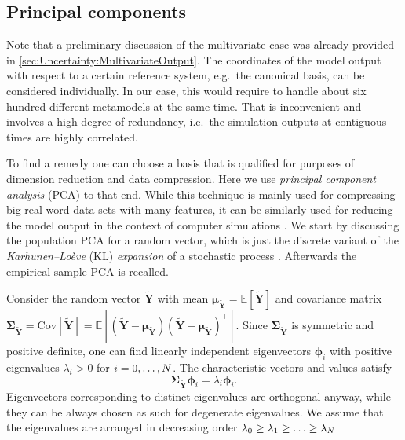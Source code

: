 \subsection{Principal components}
Note that a preliminary discussion of the multivariate case was already provided in \cref{sec:Uncertainty:MultivariateOutput}.
The coordinates of the model output with respect to a certain reference system, e.g.\ the canonical basis, can be considered individually.
In our case, this would require to handle about six hundred different metamodels at the same time.
That is inconvenient and involves a high degree of redundancy, i.e.\ the simulation outputs at contiguous times are highly correlated.
\par %
To find a remedy one can choose a basis that is qualified for purposes of dimension reduction and data compression.
Here we use \emph{principal component analysis} (PCA) \cite{Statistics:Dunteman1989,Statistics:Jackson1991,Statistics:Jolliffe2002} to that end.
While this technique is mainly used for compressing big real-word data sets with many features,
it can be similarly used for reducing the model output in the context of computer simulations \cite{PCE:Sudret2011:Proc,PCE:Sudret2013:Proc}.
We start by discussing the population PCA for a random vector,
which is just the discrete variant of the \emph{Karhunen--Lo\`{e}ve} (KL) \emph{expansion} of a stochastic process \cite{Probability:Loeve1977}.
Afterwards the empirical sample PCA is recalled.
\par %
Consider the random vector \(\tilde{\bm{Y}}\) with mean \(\bm{\mu}_{\tilde{\bm{Y}}} = \mathds{E}[\tilde{\bm{Y}}]\) and covariance matrix
\(\bm{\Sigma}_{\tilde{\bm{Y}}} = \mathrm{Cov}[\tilde{\bm{Y}}] = \mathds{E}[(\tilde{\bm{Y}}-\bm{\mu}_{\tilde{\bm{Y}}})(\tilde{\bm{Y}}-\bm{\mu}_{\tilde{\bm{Y}}})^\top]\).
Since \(\bm{\Sigma}_{\tilde{\bm{Y}}}\) is symmetric and positive definite,
one can find linearly independent eigenvectors \(\bm{\phi}_i\) with positive eigenvalues \(\lambda_i > 0\) for \(i=0,\ldots,N\).
The characteristic vectors and values satisfy
\begin{equation} \label{eq:Hydro:Eigenequation}
  \bm{\Sigma}_{\tilde{\bm{Y}}} \bm{\phi}_i = \lambda_i \bm{\phi}_i.
\end{equation}
Eigenvectors corresponding to distinct eigenvalues are orthogonal anyway, while they can be always chosen as such for degenerate eigenvalues.
We assume that the eigenvalues are arranged in decreasing order \(\lambda_0 \geq \lambda_1 \geq \ldots \geq \lambda_N\)
